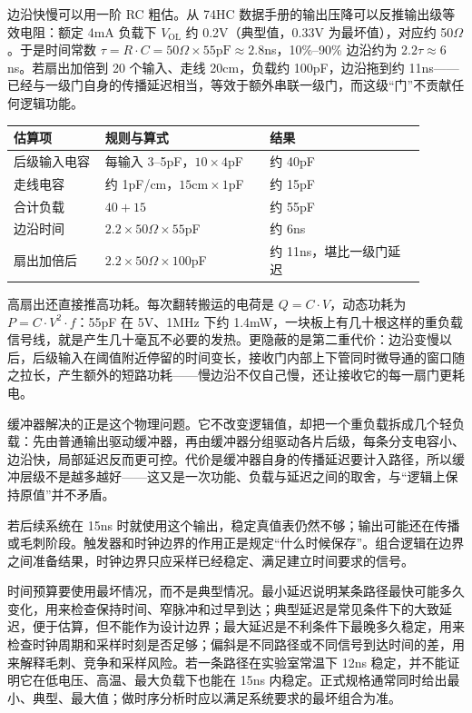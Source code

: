 边沿快慢可以用一阶 RC 粗估。从 74HC 数据手册的输出压降可以反推输出级等效电阻：额定 4mA 负载下 $V_\mathrm{OL}$ 约 0.2V（典型值，0.33V 为最坏值），对应约 50$\Omega$。于是时间常数 $\tau = R\cdot C = 50\Omega\times55\mathrm{pF}\approx2.8$ns，10\%–90\% 边沿约为 $2.2\tau\approx6$ns。若扇出加倍到 20 个输入、走线 20cm，负载约 100pF，边沿拖到约 11ns——已经与一级门自身的传播延迟相当，等效于额外串联一级门，而这级“门”不贡献任何逻辑功能。

\begin{longtable}{L{0.2\linewidth}L{0.36\linewidth}L{0.34\linewidth}}
\toprule
估算项 & 规则与算式 & 结果 \\
\midrule
后级输入电容 & 每输入 3–5pF，$10\times4$pF & 约 40pF \\\tablerowrule
走线电容 & 约 1pF/cm，$15\mathrm{cm}\times1$pF & 约 15pF \\\tablerowrule
合计负载 & $40+15$ & 约 55pF \\\tablerowrule
边沿时间 & $2.2\times50\Omega\times55$pF & 约 6ns \\\tablerowrule
扇出加倍后 & $2.2\times50\Omega\times100$pF & 约 11ns，堪比一级门延迟 \\
\bottomrule
\end{longtable}

高扇出还直接推高功耗。每次翻转搬运的电荷是 $Q=C\cdot V$，动态功耗为 $P=C\cdot V^{2}\cdot f$：55pF 在 5V、1MHz 下约 1.4mW，一块板上有几十根这样的重负载信号线，就是产生几十毫瓦不必要的发热。更隐蔽的是第二重代价：边沿变慢以后，后级输入在阈值附近停留的时间变长，接收门内部上下管同时微导通的窗口随之拉长，产生额外的短路功耗——慢边沿不仅自己慢，还让接收它的每一扇门更耗电。

缓冲器解决的正是这个物理问题。它不改变逻辑值，却把一个重负载拆成几个轻负载：先由普通输出驱动缓冲器，再由缓冲器分组驱动各片后级，每条分支电容小、边沿快，局部延迟反而更可控。代价是缓冲器自身的传播延迟要计入路径，所以缓冲层级不是越多越好——这又是一次功能、负载与延迟之间的取舍，与“逻辑上保持原值”并不矛盾。

若后续系统在 15ns 时就使用这个输出，稳定真值表仍然不够；输出可能还在传播或毛刺阶段。触发器和时钟边界的作用正是规定“什么时候保存”。组合逻辑在边界之间准备结果，时钟边界只应采样已经稳定、满足建立时间要求的信号。

时间预算要使用最坏情况，而不是典型情况。最小延迟说明某条路径最快可能多久变化，用来检查保持时间、窄脉冲和过早到达；典型延迟是常见条件下的大致延迟，便于估算，但不能作为设计边界；最大延迟是不利条件下最晚多久稳定，用来检查时钟周期和采样时刻是否足够；偏斜是不同路径或不同信号到达时间的差，用来解释毛刺、竞争和采样风险。若一条路径在实验室常温下 12ns 稳定，并不能证明它在低电压、高温、最大负载下也能在 15ns 内稳定。正式规格通常同时给出最小、典型、最大值；做时序分析时应以满足系统要求的最坏组合为准。

